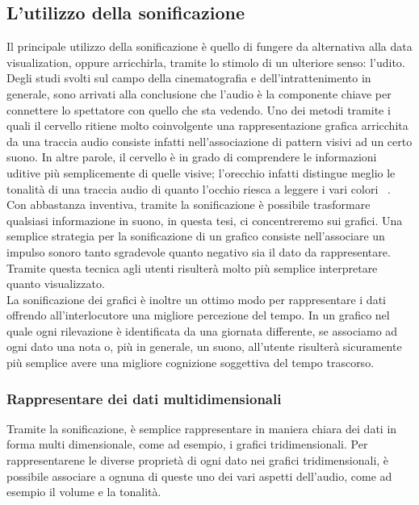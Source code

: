 \subsection{L'utilizzo della sonificazione}
Il principale utilizzo della sonificazione è quello di fungere da alternativa alla data visualization, oppure arricchirla, tramite lo stimolo di un ulteriore senso: l’udito.
\\ 
Degli studi svolti sul campo della cinematografia e dell’intrattenimento in generale, sono arrivati alla conclusione che l’audio è la componente chiave per connettere lo spettatore con quello che sta vedendo. 
Uno dei metodi tramite i quali il cervello ritiene molto coinvolgente una rappresentazione grafica arricchita da una traccia audio consiste infatti nell’associazione di pattern visivi ad un certo suono.
In altre parole, il cervello è in grado di comprendere le informazioni uditive più semplicemente di quelle visive; l’orecchio infatti distingue meglio le tonalità di una traccia audio di quanto l’occhio riesca a leggere i vari colori ~\cite{audiovideo}.
\\
Con abbastanza inventiva, tramite la sonificazione è possibile trasformare qualsiasi informazione in suono, in questa tesi, ci concentreremo sui grafici.
Una semplice strategia per la sonificazione di un grafico consiste nell'associare un impulso sonoro tanto sgradevole quanto negativo sia il dato da rappresentare.
Tramite questa tecnica agli utenti risulterà molto più semplice interpretare quanto visualizzato.
\\ 
La sonificazione dei grafici è inoltre un ottimo modo per rappresentare i dati offrendo all’interlocutore una migliore percezione del tempo. In un grafico nel quale ogni rilevazione è identificata da una giornata differente, 
se associamo ad ogni dato una nota o, più in generale, un suono, all’utente risulterà sicuramente più semplice avere una migliore cognizione soggettiva del tempo trascorso.
\\ 
\subsubsection{Rappresentare dei dati multidimensionali}
Tramite la sonificazione, è semplice rappresentare in maniera chiara dei dati in forma multi dimensionale, come ad esempio, i grafici tridimensionali. 
Per rappresentarene le diverse proprietà di ogni dato nei grafici tridimensionali, è possibile associare a ognuna di queste uno dei vari aspetti dell'audio, come ad esempio il volume e la tonalità.
